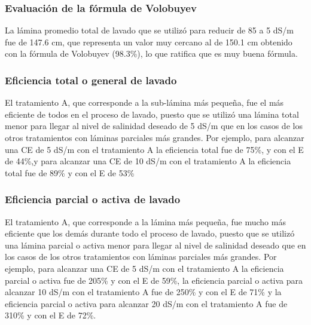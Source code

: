 \subsubsection{Evaluación de la fórmula de Volobuyev}
La lámina promedio total de lavado que se utilizó para reducir de 85 a 5 dS/m fue de 147.6 cm, que representa un valor muy cercano al de 150.1 cm obtenido con la fórmula de Volobuyev (98.3\%), lo que ratifica que es muy buena fórmula.
\subsubsection{Eficiencia total o general de lavado}
El tratamiento A, que corresponde a la sub-lámina más pequeña, fue el más eficiente de todos en el proceso de lavado, puesto que se utilizó una lámina total menor para llegar al nivel de salinidad deseado de 5 dS/m que en los casos de los otros tratamientos con láminas parciales más grandes. Por ejemplo, para alcanzar una CE de 5 dS/m con el tratamiento A la eficiencia total fue de 75\%, y con el E de 44\%,y para alcanzar una CE de 10 dS/m con el tratamiento A la eficiencia total fue de 89\% y con el E de 53\%

\subsubsection{Eficiencia parcial o activa de lavado}
El tratamiento A, que corresponde a la lámina más pequeña, fue mucho más eficiente que los demás durante todo el proceso de lavado, puesto que se utilizó una lámina parcial o activa menor para llegar al nivel de salinidad deseado que en los casos de los otros tratamientos con láminas parciales más grandes. Por ejemplo, para alcanzar una CE de 5 dS/m con el tratamiento A la eficiencia parcial o activa fue de 205\% y con el E de 59\%, la eficiencia parcial o activa para alcanzar 10 dS/m con el tratamiento A fue de 250\% y con el E de 71\% y la eficiencia parcial o activa para alcanzar 20 dS/m con el tratamiento A fue de 310\% y con el E de 72\%.

